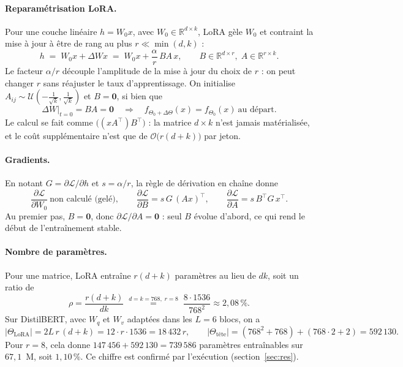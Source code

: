 \documentclass[11pt,a4paper]{article}
\newcommand{\R}{\mathbb{R}}
\begin{document}
\paragraph{Reparamétrisation LoRA.} Pour une couche linéaire $h=W_0x$, avec $W_0\in\R^{d\times k}$, LoRA gèle $W_0$ et contraint la mise à jour à être de rang au plus $r\ll\min(d,k)$ :
\begin{equation}
h \;=\; W_0x+\Delta W x \;=\; W_0x+\frac{\alpha}{r}\,B A\,x,\qquad B\in\R^{d\times r},\; A\in\R^{r\times k}.
\label{eq:lora}
\end{equation}
Le facteur $\alpha/r$ découple l'amplitude de la mise à jour du choix de $r$ : on peut changer $r$ sans réajuster le taux d'apprentissage. On initialise $A_{ij}\sim\mathcal{U}\!\left(-\tfrac{1}{\sqrt{k}},\tfrac{1}{\sqrt{k}}\right)$ et $B=\bm{0}$, si bien que
\begin{equation}
\Delta W\big|_{t=0}=BA=\bm{0}\quad\Longrightarrow\quad f_{\Theta_0+\Delta\Theta}(x)=f_{\Theta_0}(x)\ \text{au départ.}
\end{equation}
Le calcul se fait comme $\big((xA^\top)B^\top\big)$ : la matrice $d\times k$ n'est jamais matérialisée, et le coût supplémentaire n'est que de $\mathcal{O}\big(r(d+k)\big)$ par jeton.

\paragraph{Gradients.} En notant $G=\partial\mathcal{L}/\partial h$ et $s=\alpha/r$, la règle de dérivation en chaîne donne
\begin{equation}
\frac{\partial\mathcal{L}}{\partial W_0}\ \text{non calculé (gelé)},\qquad
\frac{\partial\mathcal{L}}{\partial B}=s\,G\,(Ax)^\top,\qquad
\frac{\partial\mathcal{L}}{\partial A}=s\,B^\top G\,x^\top .
\end{equation}
Au premier pas, $B=\bm 0$, donc $\partial\mathcal L/\partial A=\bm 0$ : seul $B$ évolue d'abord, ce qui rend le début de l'entraînement stable.

\paragraph{Nombre de paramètres.} Pour une matrice, LoRA entraîne $r(d+k)$ paramètres au lieu de $dk$, soit un ratio de
\begin{equation}
\rho=\frac{r(d+k)}{dk}\;\overset{d=k=768,\;r=8}{=}\;\frac{8\cdot1536}{768^2}\approx2{,}08\,\%.
\end{equation}
Sur DistilBERT, avec $W_q$ et $W_v$ adaptées dans les $L=6$ blocs, on a
\begin{equation}
|\Theta_{\text{LoRA}}|=2L\,r\,(d+k)=12\cdot r\cdot1536=18\,432\,r,
\qquad |\Theta_{\text{tête}}|=(768^2+768)+(768\cdot2+2)=592\,130 .
\end{equation}
Pour $r=8$, cela donne $147\,456+592\,130=739\,586$ paramètres entraînables sur $67{,}1$~M, soit $1{,}10\,\%$. Ce chiffre est confirmé par l'exécution (section~\ref{sec:res}).
\end{document}
